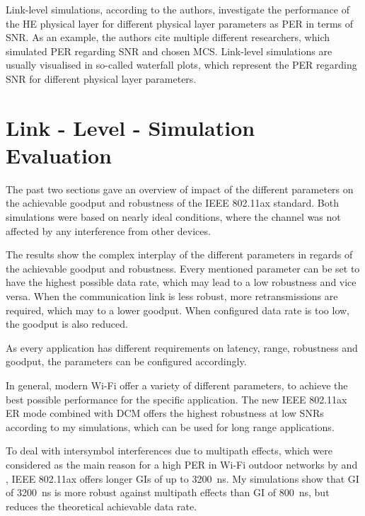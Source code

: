 \documentclass[]{nsm-thesis}
\begin{document}
Link-level simulations, according to the authors,
investigate the performance of the HE physical layer for different physical layer parameters as \ac{PER} in terms of \ac{SNR}.
As an example, the authors cite multiple different researchers, which simulated \ac{PER} regarding \ac{SNR} and chosen \ac{MCS}.
Link-level simulations are usually visualised in so-called waterfall plots, which represent the \ac{PER} regarding \ac{SNR} for
different physical layer parameters.







\section{Link - Level - Simulation Evaluation}

The past two sections gave an overview of impact of the different parameters on the achievable goodput and robustness of the IEEE 802.11ax standard.
Both simulations were based on nearly ideal conditions, where the channel was not affected by any interference from other devices.

The results show the complex interplay of the different parameters in regards of the achievable goodput and robustness.
Every mentioned parameter can be set to have the highest possible data rate, which may lead to a low robustness and vice versa.
When the communication link is less robust, more retransmissions are required, which may to a lower goodput.
When configured data rate is too low, the goodput is also reduced.

As every application has different requirements on
latency, range, robustness and goodput, the parameters can be configured accordingly.

In general, modern Wi-Fi offer a variety of different parameters, to achieve the best possible performance for the specific application.
The new IEEE 802.11ax \ac{ER} mode combined with \ac{DCM} offers the highest robustness at low \ac{SNR}s according to my simulations, which can
be used for long range applications.

To deal with intersymbol interferences due to multipath effects, which were considered as the main reason for a high \ac{PER} in  Wi-Fi outdoor networks by
\cite{sheth_packet_2007} and \cite{aguayo_link-level_2004}, IEEE 802.11ax offers longer \ac{GI}s of up to \SI{3200}{\nano\second}.
My simulations show that \ac{GI} of \SI{3200}{\nano\second} is more robust against multipath effects than \ac{GI} of \SI{800}{\nano\second}, but
reduces the theoretical achievable data rate.
\end{document}
